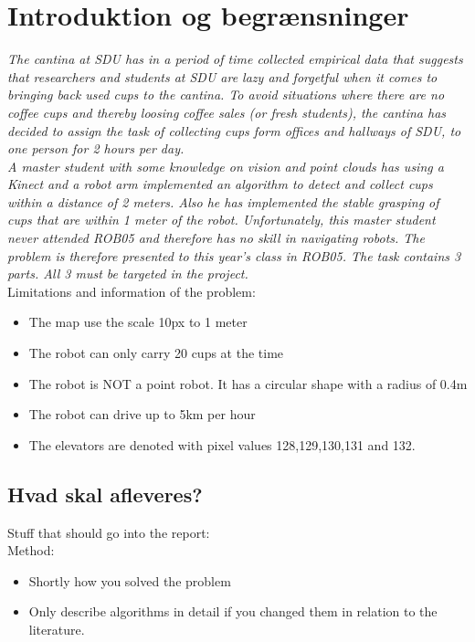\section{Introduktion og begrænsninger}
\label{sec:intro}

\textit{
The cantina at SDU has in a period of time collected empirical data that suggests that researchers and students at SDU are lazy and forgetful when it comes to bringing back used cups to the cantina. To avoid situations where there are no coffee cups and thereby loosing coffee sales (or fresh students), the cantina has decided to assign the task of collecting cups form offices and hallways of SDU, to one person for 2 hours per day.\\
A master student with some knowledge on vision and point clouds has using a Kinect and a robot arm implemented an algorithm to detect and collect cups within a distance of 2 meters. Also he has implemented the stable grasping of cups that are within 1 meter of the robot. Unfortunately, this master student never attended ROB05 and therefore has no skill in navigating robots.
The problem is therefore presented to this year’s class in ROB05. The task contains 3 parts. All 3 must be targeted in the project.}\\

Limitations and information of the problem:
\begin{itemize}
\item The map use the scale 10px to 1 meter
\item The robot can only carry 20 cups at the time
\item The robot is NOT a point robot. It has a circular shape with a radius of 0.4m
\item The robot can drive up to 5km per hour
\item The elevators are denoted with pixel values 128,129,130,131 and 132.
\end{itemize}

\subsection{Hvad skal afleveres?}
Stuff that should go into the report:\\
Method:
\begin{itemize}
\item Shortly how you solved the problem
\item Only describe algorithms in detail if you changed them in relation to the literature.
\end{itemize}

